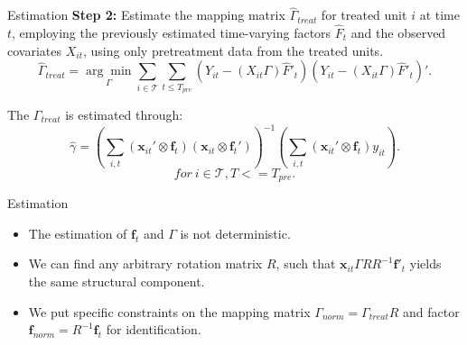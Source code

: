 \documentclass{beamer}
\begin{document}
\begin{frame}{Estimation}
    \textbf{Step 2:} Estimate the mapping matrix $\hat{\Gamma}_{treat}$ for treated unit $i$ at time $t$, employing the previously estimated time-varying factors $\hat{F}_t$ and the observed covariates $X_{it}$, using only pretreatment data from the treated units.
    \begin{equation*}
    \hat{\Gamma}_{treat} = \underset{\Gamma}{\arg\min} \sum_{i \in \mathcal{T}} \sum_{t \leq T_{pre}} \left( Y_{it} - (X_{it} \Gamma) \hat{F}'_{t} \right) \left( Y_{it} - (X_{it} \Gamma) \hat{F}'_{t} \right)'.
    \end{equation*}
    
    The $\Gamma_{treat}$ is estimated through:
    \begin{equation*}
        \hat{\gamma} = \left( \sum_{i,t} (\boldsymbol{x}_{it}' \otimes \boldsymbol{f}_t) (\boldsymbol{x}_{it} \otimes \boldsymbol{f}_t') \right)^{-1} \left( \sum_{i,t} (\boldsymbol{x}_{it}' \otimes \boldsymbol{f}_t) y_{it} \right).
    \end{equation*}
    $$for \ i \in \mathcal{T}, T<= T_{pre}.$$
\end{frame}

\begin{frame}{Estimation}
    \begin{itemize}
        \item The estimation of $\boldsymbol{f}_{t}$ and $\Gamma$ is not deterministic.
        \item We can find any arbitrary rotation matrix $R$, such that $\boldsymbol{x}_{it}\Gamma R R^{-1}\boldsymbol{f}'_{t}$ yields the same structural component.
        \item We put specific constraints on the mapping matrix $\Gamma_{norm} = \Gamma_{treat}R$ and factor $\boldsymbol{f}_{norm} = R^{-1}\boldsymbol{f}_t$ for identification.
    \end{itemize}
\end{frame}
\end{document}
